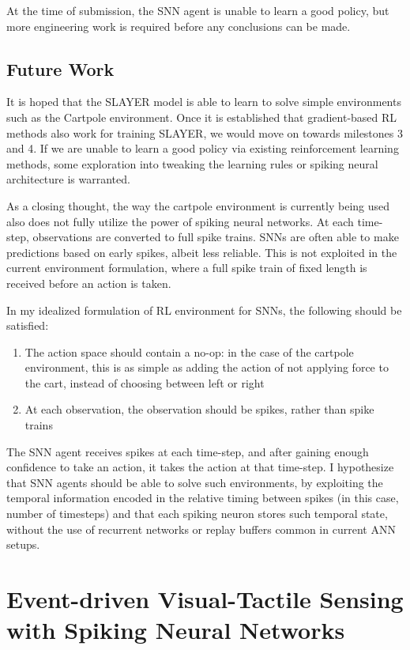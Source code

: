 \documentclass[fyp]{socreport}
\begin{document}
At the time of submission, the SNN agent is unable to learn a good policy, but
more engineering work is required before any conclusions can be made.

\section{Future Work}

It is hoped that the SLAYER model is able to learn to solve simple environments
such as the Cartpole environment. Once it is established that gradient-based RL
methods also work for training SLAYER, we would move on towards milestones 3 and
4. If we are unable to learn a good policy via existing reinforcement learning
methods, some exploration into tweaking the learning rules or spiking neural
architecture is warranted.

As a closing thought, the way the cartpole environment is currently being used
also does not fully utilize the power of spiking neural networks. At each
time-step, observations are converted to full spike trains. SNNs are often able
to make predictions based on early spikes, albeit less reliable. This is not
exploited in the current environment formulation, where a full spike train of
fixed length is received before an action is taken.

In my idealized formulation of RL environment for SNNs, the following should be
satisfied:

\begin{enumerate}
  \item The action space should contain a no-op: in the case of the cartpole
  environment, this is as simple as adding the action of not applying force to
  the cart, instead of choosing between left or right
\item At each observation, the observation should be spikes, rather than spike
trains
\end{enumerate}

The SNN agent receives spikes at each time-step, and after gaining enough
confidence to take an action, it takes the action at that time-step. I
hypothesize that SNN agents should be able to solve such environments, by
exploiting the temporal information encoded in the relative timing between
spikes (in this case, number of timesteps) and that each spiking neuron stores
such temporal state, without the use of recurrent networks or replay buffers
common in current ANN setups.

\chapter{Event-driven Visual-Tactile Sensing with Spiking Neural Networks\label{cha:vtsnn}}
\end{document}
